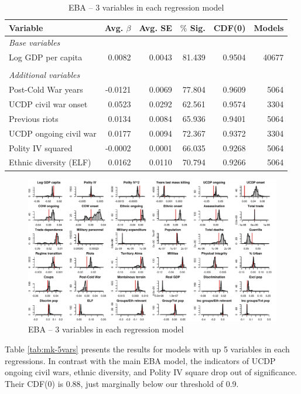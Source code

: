 \begin{table}[H]
\centering
\begin{tabular}{lrrrrr}
\hline
\textbf{Variable} & \textbf{Avg. $\beta$} & \textbf{Avg. SE} & \textbf{$\%$ Sig.} & \textbf{CDF(0)} & \textbf{Models} \\ \hline
\textit{Base variables} &  &  &  &  &  \\
Log GDP per capita & 0.0082 & 0.0043 & 81.439 & 0.9504 & 40677 \\
 &  &  &  &  &  \\
\textit{Additional variables} &  &  &  &  &  \\
Post-Cold War years & -0.0121 & 0.0069 & 77.804 & 0.9609 & 5064 \\
UCDP civil war onset & 0.0523 & 0.0292 & 62.561 & 0.9574 & 3304 \\
Previous riots &0.0134 & 0.0084 & 65.936 & 0.9401 & 5064 \\
UCDP ongoing civil war & 0.0177 & 0.0094 & 72.367 & 0.9372 & 3304 \\
Polity IV squared & -0.0002 & 0.0001 & 66.035 & 0.9268 & 5064 \\ 
Ethnic diversity (ELF) & 0.0162 & 0.0110 & 70.794 & 0.9266 & 5064 \\\hline
\end{tabular}
\caption{EBA -- 3 variables in each regression model}
\label{tab:mk-3vars}
\end{table}

\clearpage
\begin{figure}
    \centering
    \includegraphics[width=\textwidth]{images/mk-3vars.pdf}
    \caption{EBA -- 3 variables in each regression model}
    \label{fig:hist-mk-3vars}
\end{figure}
\clearpage

Table \ref{tab:mk-5vars} presents the results for models with up 5 variables in each regressions. In contrast with the main EBA model, the indicators of UCDP ongoing civil wars, ethnic diversity, and Polity IV square drop out of significance. Their CDF(0) is 0.88, just marginally below our threshold of 0.9.


